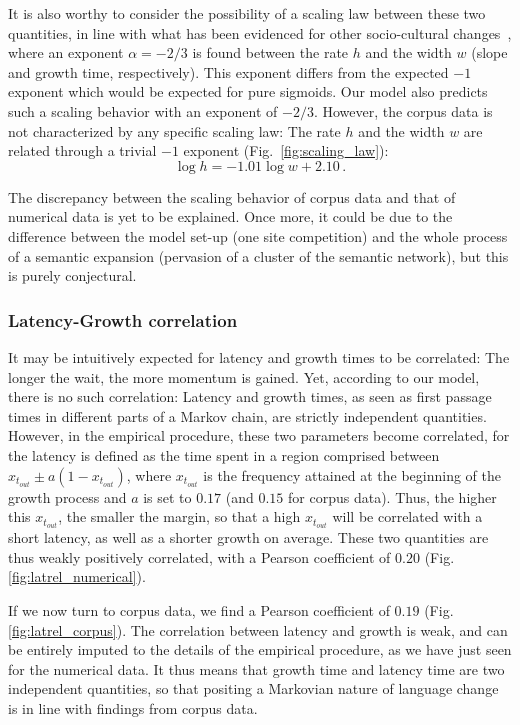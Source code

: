 \documentclass[12pt,twocolumn,amsmath,amssymb,aps,longbibliography]{revtex4-1}  %
\begin{document}
It is also worthy to consider the possibility of a scaling law between these two quantities, in line with what has been evidenced for other socio-cultural changes~\cite{michard2005theory}, where an exponent $\alpha = -2/3$ is found between the rate $h$ and the width $w$ (slope and growth time, respectively). This exponent differs from the expected $-1$ exponent which would be expected for pure sigmoids. Our model also predicts such a scaling behavior with an exponent of $-2/3$. However, the corpus data is not characterized by any specific scaling law: The rate $h$ and the width $w$ are related through a trivial $-1$ exponent (Fig.~\ref{fig:scaling_law}):
\begin{equation}
\log h  = -1.01 \log w + 2.10 \, .
\end{equation}

The discrepancy between the scaling behavior of corpus data and that of numerical data is yet to be explained. Once more, it could be due to the difference between the model set-up (one site competition) and the whole process of a semantic expansion (pervasion of a cluster of the semantic network), but this is purely conjectural. 

\subsubsection{Latency-Growth correlation}

It may be intuitively expected for latency and growth times to be correlated: The longer the wait, the more momentum is gained. Yet, according to our model, there is no such correlation: Latency and growth times, as seen as first passage times in different parts of a Markov chain, are strictly independent quantities. However, in the empirical procedure, these two parameters become correlated, for the latency is defined as the time spent in a region comprised between $x_{t_{out}} \pm a ( 1 - x_{t_{out}})$, where $x_{t_{out}}$ is the frequency attained at the beginning of the growth process and $a$ is set to $0.17$ (and $0.15$ for corpus data). Thus, the higher this $x_{t_{out}}$, the smaller the margin, so that a high $x_{t_{out}}$ will be correlated with a short latency, as well as a shorter growth on average. These two quantities are thus weakly positively correlated, with a Pearson coefficient of $0.20$ (Fig. \ref{fig:latrel_numerical}). 

If we now turn to corpus data, we find a Pearson coefficient of $0.19$ (Fig.\ref{fig:latrel_corpus}). The correlation between latency and growth is weak, and can be entirely imputed to the details of the empirical procedure, as we have just seen for the numerical data. It thus means that growth time and latency time are two independent quantities, so that positing a Markovian nature of language change is in line with findings from corpus data. 
\end{document}
